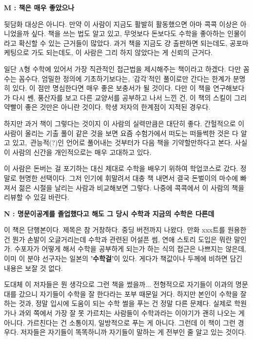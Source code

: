 \textbf{M : 책은 매우 좋았으나}
\vspace{5mm}

뒷담화 대상은 아니다. 만약 이 사람이 지금도 활발히 활동했으면 아마 콕콕 이상은 아니었을까 싶다.
책을 쓰는 법도 알고 있고, 무엇보다 돈보다도 수학을 좋아하는 인물이라고 확신할 수 있는 근거들이 많았다.
과거 책을 지금도 걍 출판하면 되는데도, 공포마케팅으로 가도 되는데도, 이 사람은 그리 하지 않았다는 게 신뢰의 근거다.
\vspace{5mm}

일단 A형 수학에 있어서 가장 직관적인 접근법을 제시해주는 책이라고 하겠다. 다만 꼼수는 꼼수다,
엄밀한 정의에 기초하기보다는, '감각'적인 풀이로만 간다는 한계가 분명히 있다. 이 점만 명심한다면 매우 좋은 보충서가 될 것이다.
다만 이 책을 연구해보다가 다시 쎈, 풍산자를 보고 다른 교양서를 공부하고 나서 느낀 건, 이 책의 스킬이 그리 약빨이 좋은 것만은 아니란 것이다.
학생 저자의 한계점이 지적된 경우다.
\vspace{5mm}

하지만 과거 책이 그렇다는 것이지 이 사람의 실력만큼은 대단히 좋다. 간헐적으로 이 사람이 올리는 기출 풀이 같은 것을 보면
요즘 수험가에서 떠도는 떠들썩한 것은 다 알고 있고, 관능적(?)인 언어로 풀어내는 것부터가 다음 책을 기약할만하다고 본다.
사실 이 사람의 신간을 개인적으로는 매우 고대하고 있다.
\vspace{5mm}

이 사람은 돈버는 걸 포기하는 대신 제대로 수학을 배우기 위하여 학업코스로 갔다. 정말로 현명한 선택이다.
그저 인기에 휘말려서 대충 책 내면서 결국 돈벌이의 마수에 빠져서 젊은 시절을 날리는 사람과 비교해보면 그렇다.
나중에 콕콕에서 이 사람의 책을 리뷰할 수 있길 바란다.
\vspace{5mm}

\textbf{N : 명문이공계를 졸업했다고 해도 그 당시 수학과 지금의 수학은 다른데}
\vspace{5mm}

이 책은 단행본이다. 제목은 참 거창하다. 중딩 버전까지 나왔다.
만화 xxx트를 원용한 건 뭔가 손발이 오글거리는데 수학과 관련된 어설픈 썸, 연애 스토리 도입은 뭐란 말인가.
수포자가 어떻게 해서 수학을 공부하게 되는가 하는 식의 접근은 나쁘지는 않은데, 이미 이 분야 선구자는 일본의 \textbf{'수학걸'}이 있다.
게다가 책값이나 두께에 비하면 담긴 내용은 보잘 것 없다.
\vspace{5mm}

도대체 이 저자들은 뭔 생각으로 그런 책을 썼을까...
전형적으로 자기들이 이과의 명문대를 갔으니 자기들이 수학을 잘 한다라는 포부 때문일 거다.
하지만 본인이 수학을 잘 하는 것과, 정말 입시에 도움이 되는 수학 썰을 푸는 건 정말 다른 문제다.
실제로 학원가나 과외 쪽에서 가장 잘 못 가르치는 사람들이 수학과라는 이야기가 괜히 나오는 게 아니다.
가르친다는 건 소통이지, 일방적으로 푸는 게 아니다.
그런데 이 책이 그런 경우다. 저자들은 자기들이 똑똑하니까 자기들이 말하는 게 전부인 줄 알고 있는 것이다.
\vspace{5mm}

